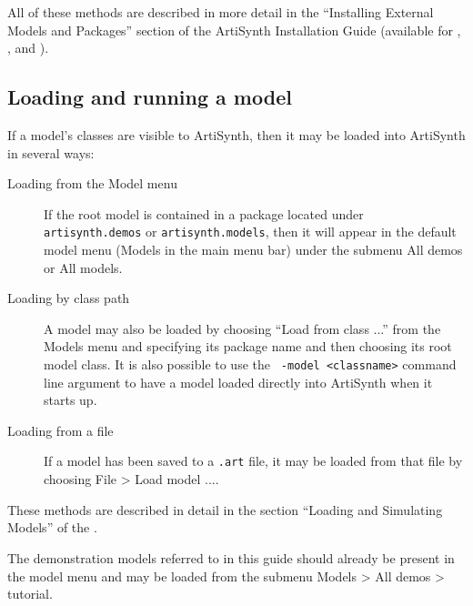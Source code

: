 All of these methods are described in more detail in the ``Installing
External Models and Packages'' section of the ArtiSynth Installation
Guide (available for 
, 
,
and 
).

\subsection{Loading and running a model}
\label{LoadingAndRunning:sec}

If a model's classes are visible to ArtiSynth, then it may be loaded
into ArtiSynth in several ways:

\begin{description}

\item[Loading from the Model menu]\mbox{}

If the root model is contained in a package located under {\tt
artisynth.demos} or {\tt artisynth.models}, then it will appear in the
default model menu ({\sf Models} in the main menu bar) under the
submenu {\sf All demos} or {\sf All models}.

\item[Loading by class path]\mbox{}

A model may also be loaded by choosing {\sf ``Load from class ...''}
from the {\sf Models} menu and specifying its package name and then
choosing its root model class. It is also possible to use the {\tt
-model <classname>} command line argument to have a model loaded
directly into ArtiSynth when it starts up.

\item[Loading from a file]\mbox{}

If a model has been saved to a {\tt .art} file, it may be loaded from
that file by choosing {\sf File > Load model ...}.

\end{description}

These methods are described in detail in the 
section ``Loading and Simulating Models'' of the\pdfbreak
{}.

\begin{sideblock}
The demonstration models referred to in this guide should already
be present in the model menu and may be loaded
from the submenu {\sf Models > All demos > tutorial}.
\end{sideblock}

